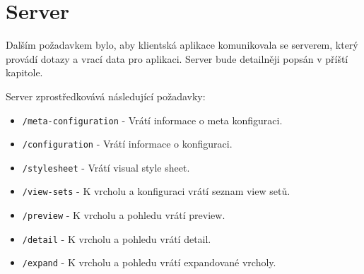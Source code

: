 \newpage

\section{Server}
Dalším požadavkem bylo, aby klientská aplikace komunikovala se serverem, který provádí dotazy a vrací data pro aplikaci. Server bude detailněji popsán v příští kapitole.

Server zprostředkovává následující požadavky:
\begin{itemize}
    \item \texttt{/meta-configuration} - Vrátí informace o meta konfiguraci.

    \item \texttt{/configuration} - Vrátí informace o konfiguraci.

    \item \texttt{/stylesheet} - Vrátí visual style sheet.

    \item \texttt{/view-sets} - K vrcholu a konfiguraci vrátí seznam view setů.

    \item \texttt{/preview} - K vrcholu a pohledu vrátí preview.

    \item \texttt{/detail} - K vrcholu a pohledu vrátí detail.

    \item \texttt{/expand} - K vrcholu a pohledu vrátí expandované vrcholy.
\end{itemize}

\newpage







